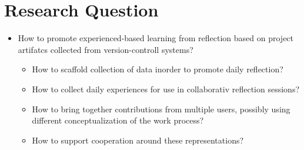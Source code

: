 \section{Research Question}

\begin{itemize}
	\item How to promote experienced-based learning from reflection based on project artifatcs collected from version-controll systems?
	\begin{itemize}
		\item How to scaffold collection of data inorder to promote daily reflection?
		\item How to collect daily experiences for use in collaborativ reflection sessions?
		\item How to bring together contributions from multiple users, possibly using different conceptualization of the work process? 
		\item How to support cooperation around these representations?
	\end{itemize}
\end{itemize}